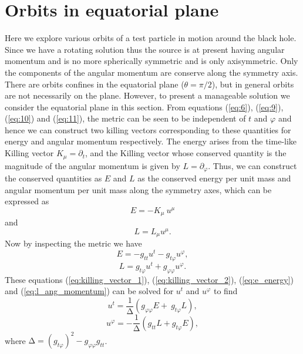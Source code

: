 \documentclass[12pt,a4paper,oneside]{book}
\newcommand{\eq}[2]{\begin{equation} \label{eq:#1} #2 \end{equation}}
\newcommand{\Eref}[1]{(\ref{eq:#1})}
\begin{document}
\chapter{Orbits in equatorial plane}\label{Sec_Orb}
Here we explore various orbits of a test particle in motion around the black hole. Since we have a rotating solution thus the source is at present having angular momentum and is no more spherically symmetric and is only axisymmetric. Only the components of the angular momentum are conserve along the symmetry axis. There are orbits confines in the equatorial plane ($\theta= \pi/2$), but in general orbits are not necessarily on the plane. However, to present a manageable solution we consider the equatorial plane in this section. From equations \Eref{6}, \Eref{9}, \Eref{10} and \Eref{11}, the metric can be seen to be independent of $t$ and $\varphi$ and hence we can construct two killing vectors corresponding to these quantities for energy and angular momentum respectively.  The energy arises from the time-like Killing vector $K_{\mu }={\partial }_t$, and the Killing vector whose conserved quantity is the magnitude of the angular momentum is given by $L={\partial }_{\varphi }$. Thus, we can construct the conserved quantities as $E$ and $L$ as the conserved energy per unit mass and angular momentum per unit mass along the symmetry axes, which can be expressed as \cite{Hartle_Gravity_book}
\eq{killing_vector_1}{E=-K_{\mu }\ u^{\mu }}
and 
\eq{killing_vector_2}{L=L_{\mu }u^{\mu }.}
Now by inspecting the metric we have
\eq{e_energy}{E=-g_{tt}u^t-g_{t\varphi }u^{\varphi },}
\eq{l_ang_momentum}{L=g_{t\varphi }u^t+g_{\varphi \varphi }u^{\varphi }.}
\noindent These equations \Eref{killing_vector_1}, \Eref{killing_vector_2}, \Eref{e_energy} and \Eref{l_ang_momentum} can be solved for $u^t$ and $u^{\varphi }$ to find
\eq{u_t}{u^t=\frac{1}{\mathrm{\Delta }}\left(g_{\varphi \varphi }E+\ g_{t\varphi }L\right),}
\eq{u_phi}{u^{\varphi }=-\frac{1}{\mathrm{\Delta }}\left(g_{tt}L+g_{t\varphi }E\right),}
where $\mathrm{\Delta }={\left(g_{t\varphi }\right)}^2-g_{\varphi \varphi }g_{tt}$.
\end{document}
